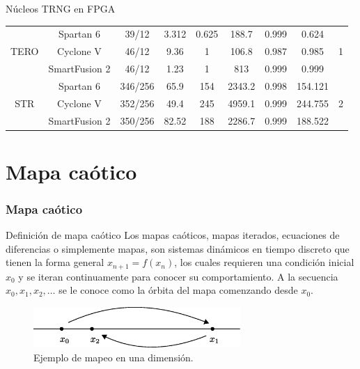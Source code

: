 \documentclass[10pt]{beamer}
\begin{document}
\begin{frame}
\begin{block}{Núcleos TRNG en FPGA}
\begin{table}[htbp]
{\begin{tabular}{|c|c|c|c|c|c|c|c|c|}
            \hline
            \multirow{3}[2]{*}{TERO} & Spartan 6 & 39/12 & 3.312 & 0.625 & 188.7 & 0.999 & 0.624 & \multirow{3}[2]{*}{1} \\
                  & Cyclone V & 46/12 & 9.36  & 1     & 106.8 & 0.987 & 0.985 &  \\
                  & SmartFusion 2 & 46/12 & 1.23  & 1     & 813   & 0.999 & 0.999 &  \\
            \hline
            \multirow{3}[2]{*}{STR} & Spartan 6 & 346/256 & 65.9  & 154   & 2343.2 & 0.998 & 154.121 & \multirow{3}[2]{*}{2} \\
                  & Cyclone V & 352/256 & 49.4  & 245   & 4959.1 & 0.999 & 244.755 &  \\
                  & SmartFusion 2 & 350/256 & 82.52 & 188   & 2286.7 & 0.999 & 188.522 &  \\
            \hline
        \end{tabular}%
    }
  \label{tab:resumen_de_trng_cores}
\end{table}%
   
	\end{block}
\end{frame}

\section{Mapa caótico}

\begin{frame}
    \frametitle{Mapa caótico}
    \begin{block}{Definición de mapa caótico}
        \justifying
        Los mapas caóticos, mapas iterados, ecuaciones de diferencias o simplemente mapas, son sistemas dinámicos en tiempo discreto que tienen la forma general $x_{n+1} = f(x_{n})$, los cuales requieren una condición inicial $x_{0}$ y se iteran continuamente para conocer su comportamiento. A la secuencia $x_{0}, x_{1}, x_{2} , \ldots $ se le conoce como la órbita del mapa comenzando desde $x_{0}$.
	\end{block}
	
	\begin{figure}[hbtp]
            \centering
            \includegraphics[width=0.7\textwidth]{F0_mapdiagram}
            \caption{Ejemplo de mapeo en una dimensión.}
            \label{fig:F0_mapdiagram}
        \end{figure}
\end{frame}
\end{document}
